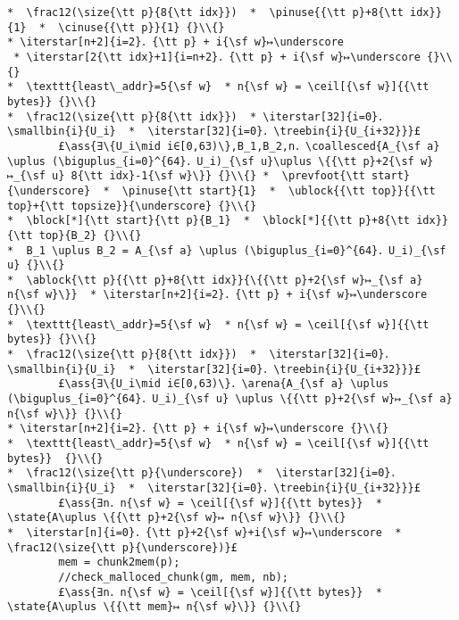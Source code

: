 \documentclass[10pt,a4paper,twoside]{report}
\makeatletter
\newcommand{\ml}[2][t]{\mbox{\mdseries\begin{tabular}[#1]{@{}L@{}}#2\end{tabular}}}
\newcommand{\ass}[1]{\ensuremath{{\color{blue}\left\{\ml[c]{#1}\right\}}}}
\renewcommand{\ceil}[2][]{\left\lceil{#2}\right\rceil_{#1}}
\newcommand{\iterstar}[2][]{\text{\LARGE $*$}^{#1}_{#2}}
\makeatother
\begin{document}
\begin{lstlisting}
*  \frac12(\size{\tt p}{8{\tt idx}})  *  \pinuse{{\tt p}+8{\tt idx}}{1}  *  \cinuse{{\tt p}}{1} {}\\{}
* \iterstar[n+2]{i=2}．{\tt p} + i{\sf w}↦\underscore  * \iterstar[2{\tt idx}+1]{i=n+2}．{\tt p} + i{\sf w}↦\underscore {}\\{}
*  \texttt{least\_addr}=5{\sf w}  * n{\sf w} = \ceil[{\sf w}]{{\tt bytes}} {}\\{}
*  \frac12(\size{\tt p}{8{\tt idx}})  * \iterstar[32]{i=0}．\smallbin{i}{U_i}  *  \iterstar[32]{i=0}．\treebin{i}{U_{i+32}}}£ 
        £\ass{∃\{U_i\mid i∈[0,63)\},B_1,B_2,n．\coallesced{A_{\sf a} \uplus (\biguplus_{i=0}^{64}．U_i)_{\sf u}\uplus \{{\tt p}+2{\sf w}↦_{\sf u} 8{\tt idx}-1{\sf w}\}} {}\\{} *  \prevfoot{\tt start}{\underscore}  *  \pinuse{\tt start}{1}  *  \ublock{{\tt top}}{{\tt top}+{\tt topsize}}{\underscore} {}\\{}
*  \block[*]{\tt start}{\tt p}{B_1}  *  \block[*]{{\tt p}+8{\tt idx}}{\tt top}{B_2} {}\\{}
*  B_1 \uplus B_2 = A_{\sf a} \uplus (\biguplus_{i=0}^{64}．U_i)_{\sf u} {}\\{}
*  \ablock{\tt p}{{\tt p}+8{\tt idx}}{\{{\tt p}+2{\sf w}↦_{\sf a} n{\sf w}\}}  * \iterstar[n+2]{i=2}．{\tt p} + i{\sf w}↦\underscore {}\\{}
*  \texttt{least\_addr}=5{\sf w}  * n{\sf w} = \ceil[{\sf w}]{{\tt bytes}} {}\\{}
*  \frac12(\size{\tt p}{8{\tt idx}})  *  \iterstar[32]{i=0}．\smallbin{i}{U_i}  *  \iterstar[32]{i=0}．\treebin{i}{U_{i+32}}}£ 
        £\ass{∃\{U_i\mid i∈[0,63)\}．\arena{A_{\sf a} \uplus (\biguplus_{i=0}^{64}．U_i)_{\sf u} \uplus \{{\tt p}+2{\sf w}↦_{\sf a} n{\sf w}\}} {}\\{} 
* \iterstar[n+2]{i=2}．{\tt p} + i{\sf w}↦\underscore {}\\{}
*  \texttt{least\_addr}=5{\sf w}  * n{\sf w} = \ceil[{\sf w}]{{\tt bytes}}  {}\\{}
*  \frac12(\size{\tt p}{\underscore})  *  \iterstar[32]{i=0}．\smallbin{i}{U_i}  *  \iterstar[32]{i=0}．\treebin{i}{U_{i+32}}}£ 
        £\ass{∃n．n{\sf w} = \ceil[{\sf w}]{{\tt bytes}}  *  \state{A\uplus \{{\tt p}+2{\sf w}↦ n{\sf w}\}} {}\\{} 
*  \iterstar[n]{i=0}．{\tt p}+2{\sf w}+i{\sf w}↦\underscore  *  \frac12(\size{\tt p}{\underscore})}£
        mem = chunk2mem(p);
        //check_malloced_chunk(gm, mem, nb);
        £\ass{∃n．n{\sf w} = \ceil[{\sf w}]{{\tt bytes}}  *  \state{A\uplus \{{\tt mem}↦ n{\sf w}\}} {}\\{} 

\end{lstlisting}
\end{document}
